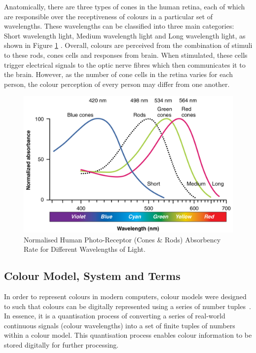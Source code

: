 Anatomically, there are three types of cones in the human retina, each of which
are responsible over the receptiveness of colours in a particular set of
wavelengths. These wavelengths can be classified into three main categories:
Short wavelength light, Medium wavelength light and Long wavelength light, as shown in Figure \ref{fig:visibleSpectrum} \cite{eyespectrum}. Overall, colours are perceived from the combination of stimuli to these rods, cones cells and responses from
brain. When stimulated, these cells trigger electrical signals to the optic nerve
fibres which then communicates it to the brain. However, as the number of cone cells
in the retina varies for each person, the colour perception of every person may differ from one another.


\begin{figure}[hbt!]
 \centering
 \includegraphics[width=.7\textwidth]{image/lit/ColorSensitivity.jpg}
 \caption[Normalised Human Photo-Receptor Absorbency Rate for Different
 Wavelength Lights]{Normalised Human Photo-Receptor (Cones \& Rods) Absorbency
 Rate for Different Wavelengths of Light. %
 }
\label{fig:visibleSpectrum}
\end{figure}


\vspace{1em}
\subsection{Colour Model, System and Terms}
\label{section:colourterm}

In order to represent colours in modern computers, colour models were designed
to such that colours can be digitally represented using a series of number
tuples~\cite{travis1991effective}. In essence, it is a quantisation process of converting
a series of real-world continuous signals (colour wavelengths) into a set of
finite tuples of numbers within a colour model. This quantisation process enables 
colour information to be stored digitally for further processing.


